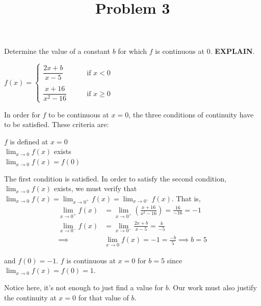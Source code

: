 \documentclass{ximera}
\title[Problem 3]{Problem 3}
\begin{document}
\begin{abstract} \end{abstract}
\maketitle


\begin{problem}
Determine the value of a constant $b$ for which $f$ is continuous at $0$. \textbf{EXPLAIN}.
	
	$f(x) =   \left\{ \begin{array}{ll}
	\dfrac{2x+b}{x-5}	 	&	\qquad \text{if } x < 0	\\ \\
	\dfrac{x+16}{x^2-16}		&	\qquad \text{if } x \ge 0	\end{array} \right.  $

\begin{explanation}
	
	In order for $f$ to be continuous at $x = 0$, the three conditions of continuity have to be satisfied.  These criteria are:
	\begin{center}
		  $f$ is defined at $x = 0$\\

	     	 $\lim_{x \to 0} f(x)$ exists\\

	    	  $\lim_{x \to 0} f(x) = f(0)$
	\end{center}

The first condition is satisfied.  In order to satisfy the second condition,  $\lim_{x \to 0} f(x)$ exists, we must verify that $\lim_{x \to 0} f(x)=\lim_{x \to 0^+} f(x)=\lim_{x \to 0^-} f(x)$.
That is, 
	\begin{align*}
		\lim_{x \to 0^+} f(x)&=\lim_{x \to 0^+} \left(\frac{x+16}{x^2-16}\right)=\frac{16}{-16}=-1\\
		\lim_{x \to 0^-} f(x)&=\lim_{x \to 0^-}\frac{2x+b}{x-5}=\frac{b}{-5}\\
		\implies & \lim_{x \to 0} f(x)=-1=\frac{-b}{5} \implies b=5
	\end{align*}

and $f(0)=-1$. $f$ is continuous at $x=0$ for $b=5$ since  $\lim_{x \to 0} f(x)=f(0)=1$.
	
	Notice here, it's not enough to just find a value for $b$. Our work must also justify the continuity at $x=0$ for that value of $b$.
	\end{explanation}
\end{problem}
\end{document}
